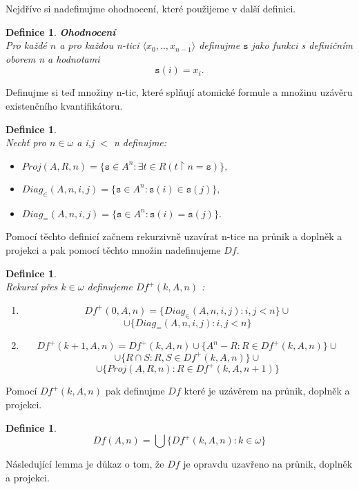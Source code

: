 \documentclass[12pt,a4paper]{article}
\newtheorem{definice}[veta]{Definice}
\begin{document}
Nejd\v{r}\'{i}ve si nadefinujme ohodnocen\'{i}, kter\'{e} pou\v{z}ijeme v dal\v{s}\'{i} definici.
\begin{definice}%
\textbf{Ohodnocen\'{i} \\ }
Pro ka\v{z}d\'{e}  $\mathit{n} $ a pro ka\v{z}dou n-tici $ \langle x_0,..,x_{n-1} \rangle $ definujme $ \mathtt{s} $  jako funkci s defini\v{c}n\'{i}m oborem n a hodnotami
\[  \mathtt{s}(i)=x_i.  \] 
\end{definice}

Definujme si te\v{d} mno\v{z}iny n-tic, kter\'{e} spl\v{n}uj\'{i} atomick\'{e} formule a mno\v{z}inu uz\'{a}v\v{e}ru existen\v{c}n\'{i}ho kvantifik\'{a}toru.
\begin{definice}%
~\\
Nech\v{t} pro $ n \in \omega $ a i,j $ < $ n definujme: 
\begin{itemize}
\item  $ Proj(A,R,n) =  \{ \mathtt{s} \in A^n : \exists t \in R (t \upharpoonright n = \mathtt{s}) \}, $  
\item  $ Diag_{\in}(A,n,i,j) =  \{ \mathtt{s} \in A^n : \mathtt{s}(i) \in \mathtt{s}(j) \}, $  
\item $ Diag_{=}(A,n,i,j) =  \{ \mathtt{s} \in A^n : \mathtt{s}(i) = \mathtt{s}(j) \}.    $
\end{itemize}
\end{definice}
Pomoc\'{i} t\v{e}chto definic\'{i} za\v{c}nem rekurzivn\v{e} uzav\'{i}rat n-tice na pr\r{u}nik a dopln\v{e}k a projekci a pak pomoc\'{i} t\v{e}chto mno\v{z}in nadefinujeme $Df$.

\begin{definice}~\\
Rekurz\'{i} p\v{r}es  $ k \in \omega $ definujeme  $ Df^+(k,A,n) $ : 
\begin{center}
\begin{enumerate}
\item  
\[ Df^+(0,A,n) = \{ Diag_{\in}(A,n,i,j): i,j <  n \} \cup  \] \[ \cup \{ Diag_{=}(A,n,i,j): i,j <  n \}  \]

\item \[  Df^+(k+1,A,n) = Df^+(k,A,n) \cup \{ A^n-R: R \in Df^+(k,A,n) \} \cup \] \[ \cup \{ R \cap S: R,S \in Df^+(k,A,n) \} \cup \] \[ \cup \{ Proj(A,R,n) : R \in Df^+(k,A,n+1) \} \]   
\end{enumerate}
\end{center}
\end{definice}

Pomoc\'{i} $  Df^+(k,A,n) $ pak definujme $Df$ kter\'{e} je uz\'{a}v\v{e}rem na pr\r{u}nik, dopln\v{e}k a projekci.
\begin{definice}
\[  Df(A,n)= \bigcup \{Df^+(k,A,n):k \in \omega \} \]  

\end{definice}
N\'{a}sleduj\'{i}c\'{i} lemma je d\r{u}kaz o tom, \v{z}e $Df$ je opravdu uzav\v{r}eno na pr\r{u}nik, dopln\v{e}k a projekci.
\end{document}
